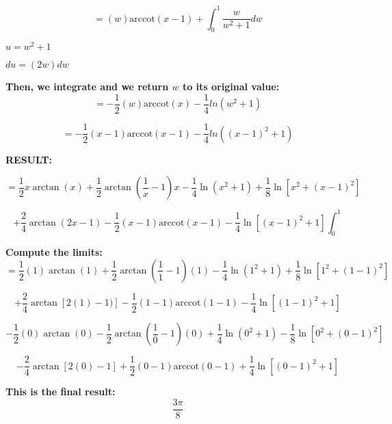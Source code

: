 \documentclass{article}
\begin{document}
\begin{equation*}
   =(w)\textrm{arccot}(x-1)+\int_{0}^{1}\frac{w}{w^2+1}dw
\end{equation*}
\begin{list}{}{}
       \item $u=w^2+1$
       \item $du=(2w)dw$
\end{list}

\bigskip\textbf{Then, we integrate and we return $w$ to its original value:}
\begin{equation*}
   =-\frac{1}{2}(w)\textrm{arccot}(x)-\frac{1}{4}ln(w^2+1)
\end{equation*}

\begin{equation*}
   =-\frac{1}{2}(x-1)\textrm{arccot}(x-1)-\frac{1}{4}ln((x-1)^2+1)
\end{equation*}

\bigskip \textbf{RESULT:}

\begin{equation*}
    =\frac{1}{2} x \arctan(x) +\frac{1}{2} \arctan(\frac{1}{x}-1) x -\frac{1}{4} \ln{(x^2 +1)} +\frac{1}{8} \ln{[x^2 +(x-1)^2]}
\end{equation*}

\begin{equation*}
        +\frac{2}{4}\arctan(2x-1) -\frac{1}{2}(x-1) \text{arccot} (x-1) -\frac{1}{4}\ln{[(x-1)^2 +1]} \int_0^1
\end{equation*}

\bigskip\textbf{Compute the limits:}
\begin{equation*}
    =\frac{1}{2} (1) \arctan(1) +\frac{1}{2} \arctan(\frac{1}{1}-1) (1) -\frac{1}{4} \ln{(1^2 +1)} +\frac{1}{8} \ln{[1^2 +(1-1)^2]}
\end{equation*}

\begin{equation*}
        +\frac{2}{4}\arctan[2(1)-1)] -\frac{1}{2}(1-1) \text{arccot} (1-1) -\frac{1}{4}\ln{[(1-1)^2 +1]} 
\end{equation*}

\begin{equation*}
    -\frac{1}{2} (0) \arctan(0) -\frac{1}{2} \arctan(\frac{1}{0}-1) (0) +\frac{1}{4} \ln{(0^2 +1)} -\frac{1}{8} \ln{[0^2 +(0-1)^2]}
\end{equation*}

\begin{equation*}
        -\frac{2}{4}\arctan[2(0)-1] +\frac{1}{2}(0-1) \text{arccot} (0-1) +\frac{1}{4}\ln{[(0-1)^2 +1]}
\end{equation*}

\bigskip\textbf{This is the final result:}
\begin{equation*}
    \frac{3\pi}{8} 
\end{equation*}
\end{document}
